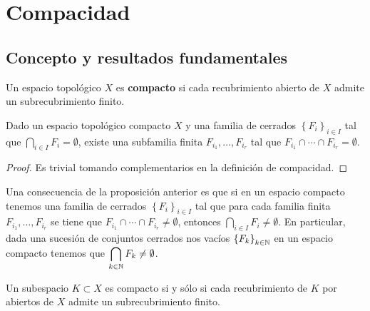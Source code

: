 \chapter{Compacidad}
\section{Concepto y resultados fundamentales}
\begin{definition}
Un espacio topológico $\displaystyle X $ es \textbf{compacto} si cada recubrimiento abierto de $\displaystyle X $ admite un subrecubrimiento finito. 
\end{definition}
\begin{prop}
	Dado un espacio topológico compacto $\displaystyle X $ y una familia de cerrados $\displaystyle \left\{ F_{i}\right\} _{i \in I} $ tal que $\displaystyle \bigcap_{ i \in I}F_{i}= \emptyset $, existe una subfamilia finita $\displaystyle F_{i_{1}}, \ldots, F_{i_{r}} $ tal que $\displaystyle F_{i_{1}}\cap \cdots \cap F_{i_{r}}= \emptyset $.
\end{prop}
\begin{proof}
Es trivial tomando complementarios en la definición de compacidad.
\end{proof}
\begin{observation}
	Una consecuencia de la proposición anterior es que si en un espacio compacto tenemos una familia de cerrados $\displaystyle \left\{ F_{i}\right\} _{i \in I} $ tal que para cada familia finita $\displaystyle F_{i_{1}}, \ldots, F_{i_{r}} $ se tiene que $\displaystyle F_{i_{1}} \cap \cdots \cap F_{i_{r}} \neq \emptyset $, entonces $\displaystyle \bigcap_{i \in I}F_{i}\neq \emptyset $. En particular, dada una sucesión de conjuntos cerrados nos vacíos $\displaystyle \left\{ F_{k}\right\} _{k \in \mathbb{N}} $ en un espacio compacto tenemos que $\displaystyle \bigcap_{k \in \mathbb{N}}F_{k}\neq \emptyset $.
\end{observation}
\begin{prop}
Un subespacio $\displaystyle K\subset X $ es compacto si y sólo si cada recubrimiento de $\displaystyle K $ por abiertos de $\displaystyle X $ admite un subrecubrimiento finito. 
\end{prop}
